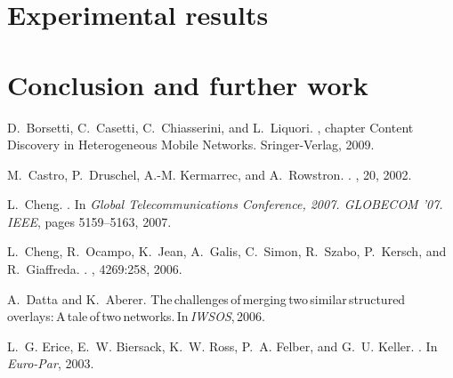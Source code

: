 \documentclass{llncs}
\newcommand{\up}[1]    {\vspace{-#1mm}}
\begin{document}
\section{Experimental results\label{sec:experiences}}
\up{3}

\up{3}
\section{Conclusion and further work\label{sec:conclusion}}
\up{3}


% 
 
\begin{thebibliography}{10}
{\scriptsize
{}
D.~Borsetti, C.~Casetti, C.~Chiasserini, and L.~Liquori.
, chapter {Content Discovery in Heterogeneous Mobile Networks}.
\newblock Sringer-Verlag, 2009.

M.~Castro, P.~Druschel, A.-M. Kermarrec, and A.~Rowstron.
.
,
  20, 2002.

L.~Cheng.
.
\newblock In {\em Global Telecommunications Conference, 2007. {GLOBECOM} '07.
  {IEEE}}, pages 5159--5163, 2007.

L.~Cheng, R.~Ocampo, K.~Jean, A.~Galis, C.~Simon, R.~Szabo, P.~Kersch, and
  R.~Giaffreda.
.
, 4269:258, 2006.

A.~Datta and K.~Aberer.
\newblock The\,challenges\,of\,merging\,two\,similar\,structured\,overlays:\,{A}\,tale\,of\,two\,networks.\,In\,{\em IWSOS},\,2006.

L.~G. Erice, E.~W. Biersack, K.~W. Ross, P.~A. Felber, and G.~U. Keller.
.
\newblock In {\em Euro-Par}, 2003.


}
\end{thebibliography}
\end{document}
